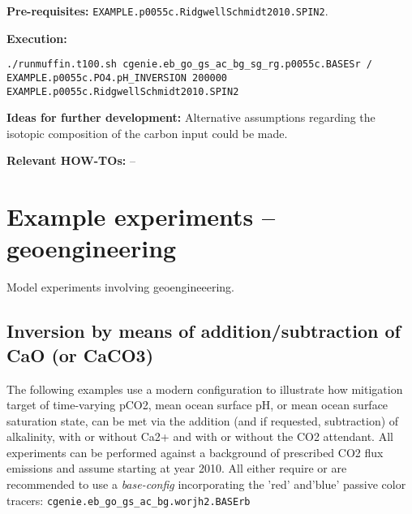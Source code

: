 \documentclass[10pt,twoside]{article}
\begin{document}
\noindent \textbf{Pre-requisites:} \texttt{EXAMPLE.p0055c.RidgwellSchmidt2010.SPIN2}.

\noindent \textbf{Execution:} 
\vspace{-10pt}\small\begin{verbatim}./runmuffin.t100.sh cgenie.eb_go_gs_ac_bg_sg_rg.p0055c.BASESr / EXAMPLE.p0055c.PO4.pH_INVERSION 200000 
EXAMPLE.p0055c.RidgwellSchmidt2010.SPIN2\end{verbatim}\normalsize\vspace{-10pt}

\noindent \textbf{Ideas for further development:} Alternative assumptions regarding the isotopic composition of the carbon input could be made. 

\noindent \textbf{Relevant HOW-TOs:} --


\newpage
\section{Example experiments -- \textbf{geoengineering}}\label{example_experiments_geoengineering}

Model experiments involving geoengineeering.


\subsection{Inversion by means of addition/subtraction of CaO (or CaCO3)}

The following examples use a modern configuration to illustrate how mitigation target of time-varying pCO2, mean ocean surface pH, or mean ocean surface saturation state, can be met via the addition (and if requested, subtraction) of alkalinity, with or without Ca2+ and with or without the CO2 attendant.
All experiments can be performed against a background of prescribed CO2 flux emissions and assume starting at year 2010. All either require or are recommended to use a \textit{base-config} incorporating the 'red' and'blue' passive color tracers: \texttt{cgenie.eb\_go\_gs\_ac\_bg.worjh2.BASErb}
\end{document}
